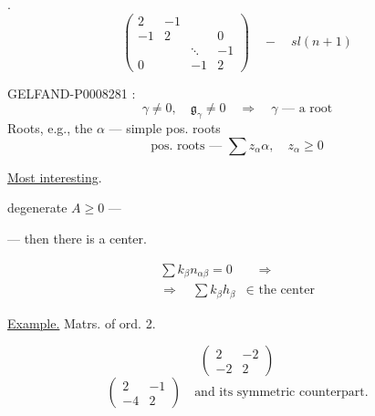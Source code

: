 .
\[
\begin{pmatrix}
2&-1&&\\
-1&2&&0\\
&&\ddots&-1\\
0&&-1&2
\end{pmatrix}
\quad-\quad sl(n+1)
\]


\begin{GelfandAdjacentEvidence}{GELFAND-P000828}{1}
:
\[
\gamma\ne0,\quad\mathfrak g_\gamma\ne0
\quad\Rightarrow\quad\gamma\text{ — a root}
\]
Roots, e.g., the \(\alpha\) — simple pos. roots
\[
\text{pos. roots — }\sum z_\alpha\alpha,\quad z_\alpha\ge0
\]

\uline{Most interesting}.

degenerate \(A\ge0\) —

— then there is a center.

\begin{equation*}
\begin{aligned}
\sum k_\beta n_{\alpha\beta}=0&\quad\Rightarrow\\
\Rightarrow\quad\sum k_\beta h_\beta&\in\text{ the center}
\end{aligned}\tag{26}
\end{equation*}

\uline{Example.} Matrs. of ord. 2.

\begin{equation*}
\begin{pmatrix}2&-2\\-2&2\end{pmatrix}\tag{27}
\end{equation*}
\begin{equation*}
\begin{pmatrix}2&-1\\-4&2\end{pmatrix}
\quad\text{and its symmetric counterpart.}\tag{28}
\end{equation*}

\end{GelfandAdjacentEvidence}
